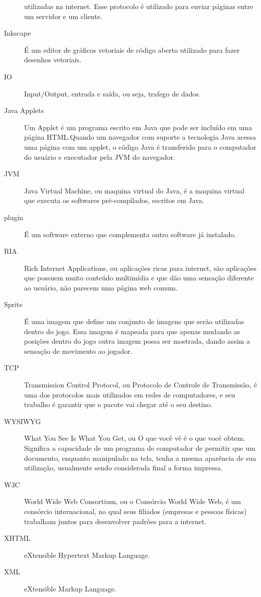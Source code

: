 \begin{description}
utilizadas na internet. Esse protocolo é utilizado para enviar páginas
entre um servidor e um cliente.
\item[Inkscape ] É um editor de gráficos vetoriais de código aberto
utilizado para fazer desenhos vetoriais.
\item[IO ] Input/Output, entrada e saída, ou seja, trafego de dados.
\item[Java Applets ] Um Applet é um programa escrito em Java que pode
ser incluído em uma página HTML.Quando um navegador com suporte a
tecnologia Java acessa uma página com um applet, o código Java é
transferido para o computador do usuário e executador pela JVM do
navegador.
\item[JVM ] Java Virtual Machine, ou maquina virtual do Java, é a
maquina virtual que executa os softwares pré-compilados, escritos em
Java.
\item[plugin ] É um software externo que complementa outro software já
instalado.
\item[RIA ] Rich Internet Applications, ou aplicações ricas para
internet, são aplicações que possuem muito conteúdo multimídia e que
dão uma sensação diferente ao usuário, não parecem uma página web
comum.
\item[Sprite ] É uma imagem que define um conjunto de imagens que
serão utilizadas dentro do jogo. Essa imagem é mapeada para que apenas
mudando as posições dentro do jogo outra imagem possa ser mostrada,
dando assim a sensação de movimento ao jogador.
\item[TCP ] Transmission Control Protocol, ou Protocolo de Controle de
Transmissão, é uma dos protocolos mais utilizados em redes de
computadores, e seu trabalho é garantir que o pacote vai chegar até o
seu destino.
\item[WYSIWYG ] What You See Is What You Get, ou O que você vê é o que
você obtem. Significa a capacidade de um programa de computador de
permitir que um documento, enquanto manipulado na tela, tenha a mesma
aparência de sua utilização, usualmente sendo considerada final a
forma impressa.
\item[W3C ] World Wide Web Consortium, ou o Consórcio World Wide Web,
é um consórcio internacional, no qual seus filiados (empresas e
pessoas físicas) trabalham juntos para desenvolver padrões para a
internet.
\item[XHTML ] eXtensible Hypertext Markup Language.
\item[XML ] eXtensible Markup Language.

\end{description}
\newpage
